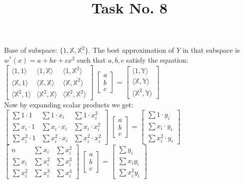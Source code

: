 \documentclass[a4paper,12pt] {article}
\title{Task No. 8}
\begin{document}
\maketitle
\thispagestyle{empty}

Base of subspace: $\{1,  \mathbb{X}, \mathbb{X}^2\}$.
The best approximation of $Y$ in that subspace is $w^*(x) = a + bx + cx^2$ such that $a,b,c$ satisfy the equation:\\

$
\begin{bmatrix}
\langle 1, 1\rangle & \langle 1, \mathbb{X} \rangle & \langle 1, \mathbb{X}^2 \rangle\\
\langle \mathbb{X}, 1\rangle & \langle \mathbb{X}, \mathbb{X} \rangle & \langle \mathbb{X},\mathbb{X}^2 \rangle\\
\langle \mathbb{X}^2, 1 \rangle & \langle \mathbb{X}^2, \mathbb{X} \rangle & \langle \mathbb{X}^2, \mathbb{X}^2 \rangle
\end{bmatrix}
$
$
\begin{bmatrix}
a \\
b \\
c
\end{bmatrix}
$
=
$
\begin{bmatrix}
\langle 1, \mathbb{Y}\rangle \\
\langle \mathbb{X}, \mathbb{Y}\rangle \\
\langle \mathbb{X}^2, \mathbb{Y}\rangle
\end{bmatrix}
$\\

Now by expanding scalar products we get:\\

$
\begin{bmatrix}
\sum 1 \cdot 1 & \sum 1 \cdot x_i & \sum 1 \cdot x_i^2 \\
\sum x_i \cdot 1 & \sum x_i \cdot x_i & \sum x_i \cdot x_i^2 \\
\sum x_i^2 \cdot 1 & \sum x_i^2 \cdot x_i & \sum x_i^2 \cdot x_i^2
\end{bmatrix}
$
$
\begin{bmatrix}
a \\
b \\
c
\end{bmatrix}
$
=
$
\begin{bmatrix}
\sum 1 \cdot y_i \\
\sum x_i \cdot y_i \\
\sum x_i^2 \cdot y_i
\end{bmatrix}
$\\


$
\begin{bmatrix}
n & \sum x_i & \sum  x_i^2 \\
\sum x_i & \sum x_i^2 & \sum x_i^3 \\
\sum x_i^2 & \sum x_i^3 & \sum x_i^4
\end{bmatrix}
$
$
\begin{bmatrix}
a \\
b \\
c
\end{bmatrix}
$
=
$
\begin{bmatrix}
\sum y_i \\
\sum x_i y_i \\
\sum x_i^2 y_i
\end{bmatrix}
$
\end{document}
